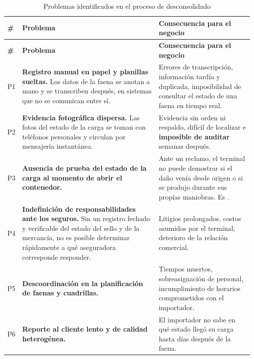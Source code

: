 {\estilotabla
\begin{longtable}{L{0.05\textwidth} L{0.46\textwidth} L{0.40\textwidth}}

\caption{Problemas identificados en el proceso de desconsolidado}
\label{tab:problemas}
\\

\toprule
\textbf{\#} & \textbf{Problema} & \textbf{Consecuencia para el negocio} \\
\midrule
\endfirsthead

\toprule
\textbf{\#} & \textbf{Problema} & \textbf{Consecuencia para el negocio} \\
\midrule
\endhead

P1 &
\textbf{Registro manual en papel y planillas sueltas.} Los datos de la faena se anotan a mano y se
transcriben después, en sistemas que no se comunican entre sí. &
Errores de transcripción, información tardía y duplicada, imposibilidad de consultar el estado de
una faena en tiempo real. \\

\midrule

P2 &
\textbf{Evidencia fotográfica dispersa.} Las fotos del estado de la carga se toman con teléfonos
personales y circulan por mensajería instantánea. &
Evidencia sin orden ni respaldo, difícil de localizar e \textbf{imposible de auditar} semanas
después. \\

\midrule

P3 &
\textbf{Ausencia de prueba del estado de la carga al momento de abrir el contenedor.} &
Ante un reclamo, el terminal no puede demostrar si el daño venía desde origen o si se produjo
durante sus propias maniobras. Es . \\

\midrule

P4 &
\textbf{Indefinición de responsabilidades ante los seguros.} Sin un registro fechado y verificable
del estado del sello y de la mercancía, no es posible determinar rápidamente a qué aseguradora
corresponde responder. &
Litigios prolongados, costos asumidos por el terminal, deterioro de la relación comercial. \\

\midrule

P5 &
\textbf{Descoordinación en la planificación de faenas y cuadrillas.} &
Tiempos muertos, sobreasignación de personal, incumplimiento de horarios comprometidos con el
importador. \\

\midrule

P6 &
\textbf{Reporte al cliente lento y de calidad heterogénea.} &
El importador no sabe en qué estado llegó su carga hasta días después de la faena. \\

\bottomrule

\end{longtable}
}

